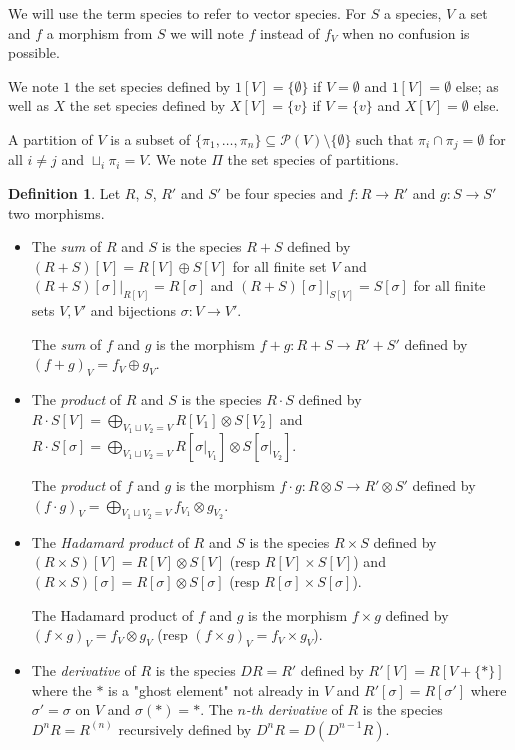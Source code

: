 \documentclass[a4paper]{article}
\DeclareMathOperator{\id}{id}
\theoremstyle{definition}
\newtheorem{definition}{Definition}
\begin{document}
We will use the term species to refer to vector species. For $S$ a species, $V$ a set and $f$ a morphism from $S$ we will note $f$ instead of $f_V$ when no confusion is possible.

We note $1$ the set species defined by $1[V] = \{\emptyset\}$ if $V=\emptyset$ and $1[V] = \emptyset$ else; as well as $X$ the set species defined by $X[V] = \{v\}$ if $V=\{v\}$ and $X[V] = \emptyset$ else.

A partition of $V$ is a subset of $\{\pi_1,\dots, \pi_n\} \subseteq \mathcal{P}(V)\setminus\{\emptyset\}$ such that $\pi_i\cap \pi_j = \emptyset$ for all $i\not = j$ and $\sqcup_i \pi_i = V$. We note $\Pi$ the set species of partitions.

\begin{definition}
Let $R$, $S$, $R'$ and $S'$ be four species and $f:R\rightarrow R'$ and $g:S\rightarrow S'$ two morphisms.
\begin{itemize}
\item The \textit{sum} of $R$ and $S$ is the species $R+ S$ defined by $(R+S)[V] = R[V]\oplus S[V]$ for all finite set $V$ and $(R+S)[\sigma]|_{R[V]} = R[\sigma]$ and $(R+ S)[\sigma]|_{S[V]} = S[\sigma]$ for all finite sets $V,V'$ and bijections $\sigma: V\rightarrow V'$.

The \textit{sum} of $f$ and $g$ is the morphism $f+ g: R +S\rightarrow R'+ S'$ defined by $(f+g)_V = f_V\oplus g_V$.
\item The \textit{product} of $R$ and $S$ is the species $R\cdot S$ defined by $R\cdot S[V] = \bigoplus_{V_1\sqcup V_2 = V} R[V_1]\otimes S[V_2]$ and $R\cdot S[\sigma] = \bigoplus_{V_1\sqcup V_2 = V} R[\sigma|_{V_1}]\otimes S[\sigma|_{V_2}]$.

The \textit{product} of $f$ and $g$ is the morphism $f\cdot g: R\otimes S\rightarrow R'\otimes S'$ defined by $(f\cdot g)_V = \bigoplus_{V_1\sqcup V_2 = V}f_{V_1}\otimes g_{V_2}$.
\item The \textit{Hadamard product} of $R$ and $S$ is the species $R\times S$ defined by $(R\times S)[V] = R[V]\otimes S[V]$ (resp $R[V]\times S[V]$) and $(R\times S)[\sigma] = R[\sigma]\otimes S[\sigma]$ (resp $R[\sigma]\times S[\sigma]$).

The Hadamard product of $f$ and $g$ is the morphism $f\times g$ defined by $(f\times g)_V = f_V\otimes g_V$ (resp $(f\times g)_V = f_V\times g_V$).
\item The \textit{derivative} of $R$ is the species $DR=R'$ defined by $R'[V] = R[V+\{\ast\}]$ where the $\ast$ is a "ghost element" not already in $V$ and $R'[\sigma]= R[\sigma']$ where $\sigma' = \sigma$ on $V$ and $\sigma(\ast) = \ast$. The \textit{$n$-th derivative} of $R$ is the species $D^nR=R^{(n)}$ recursively defined by $D^nR = D(D^{n-1}R)$.


\end{itemize}
\end{definition}
\end{document}
